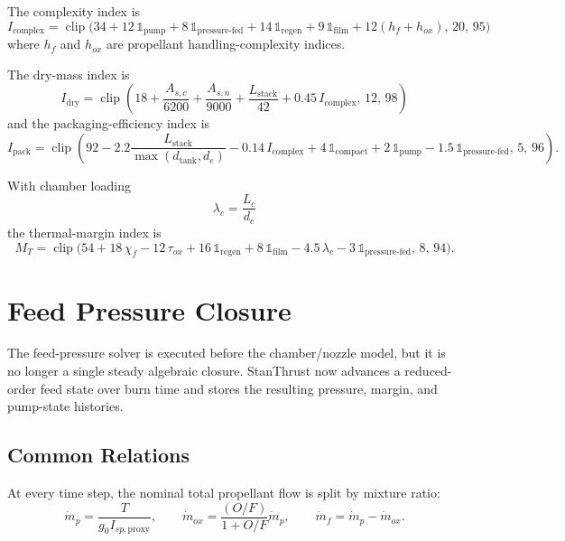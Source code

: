 \documentclass[11pt]{article}
\newcommand{\clip}{\operatorname{clip}}
\begin{document}
The complexity index is
\begin{equation}
I_{\text{complex}}
=
\clip\!\Big(
34
+12\,\mathbb{1}_{\text{pump}}
+8\,\mathbb{1}_{\text{pressure-fed}}
+14\,\mathbb{1}_{\text{regen}}
+9\,\mathbb{1}_{\text{film}}
+12(h_f+h_{ox}),
\,
20,\,
95
\Big)
\label{eq:complexity}
\end{equation}
where $h_f$ and $h_{ox}$ are propellant handling-complexity indices.

The dry-mass index is
\begin{equation}
I_{\text{dry}}
=
\clip\!\left(
18+\frac{A_{s,c}}{6200}+\frac{A_{s,n}}{9000}+\frac{L_{\text{stack}}}{42}+0.45\,I_{\text{complex}},
\,
12,\,
98
\right)
\label{eq:dry-mass}
\end{equation}
and the packaging-efficiency index is
\begin{equation}
I_{\text{pack}}
=
\clip\!\left(
92
-2.2\frac{L_{\text{stack}}}{\max(d_{\text{tank}},d_e)}
-0.14\,I_{\text{complex}}
+4\,\mathbb{1}_{\text{compact}}
+2\,\mathbb{1}_{\text{pump}}
-1.5\,\mathbb{1}_{\text{pressure-fed}},
\,
5,\,
96
\right).
\label{eq:packaging}
\end{equation}

With chamber loading
\begin{equation}
\lambda_c=\frac{L_c}{d_c}
\label{eq:chamber-loading}
\end{equation}
the thermal-margin index is
\begin{equation}
M_T
=
\clip\!\Big(
54
+18\,\chi_f
-12\,\tau_{ox}
+16\,\mathbb{1}_{\text{regen}}
+8\,\mathbb{1}_{\text{film}}
-4.5\,\lambda_c
-3\,\mathbb{1}_{\text{pressure-fed}},
\,
8,\,
94
\Big).
\label{eq:thermal-margin}
\end{equation}

\section{Feed Pressure Closure}
The feed-pressure solver is executed before the chamber/nozzle model, but it is no longer a single steady algebraic closure. StanThrust now advances a reduced-order feed state over burn time and stores the resulting pressure, margin, and pump-state histories.

\subsection{Common Relations}
At every time step, the nominal total propellant flow is split by mixture ratio:
\begin{equation}
\dot{m}_p=\frac{T}{g_0 I_{sp,\text{proxy}}},
\qquad
\dot{m}_{ox}=\frac{(O/F)}{1+O/F}\dot{m}_p,
\qquad
\dot{m}_f=\dot{m}_p-\dot{m}_{ox}.
\label{eq:feed-mass-flow-split}
\end{equation}
\end{document}
